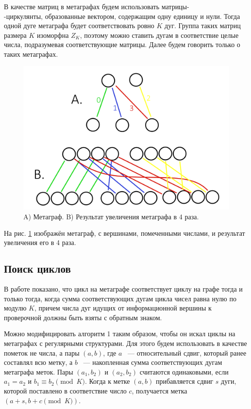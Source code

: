 \documentclass[14pt]{mmcs-article}
\begin{document}
В качестве матриц в метаграфах будем использовать матрицы-\\-циркулянты, образованные вектором, содержащим одну единицу и нули. Тогда одной дуге метаграфа будет соответствовать ровно $K$ дуг. Группа таких матриц размера $K$ изоморфна $Z_K$, поэтому можно ставить дугам в соответствие целые числа, подразумевая соответствующие матрицы. Далее будем говорить только о таких метаграфах.

\begin{figure}[H]
  \centering
  \includegraphics[scale=0.35]{Fig_8.png}
  \caption{ A) Метаграф. B) Результат увеличения метаграфа в 4 раза. }
  \label{metagraph:1}
\end{figure}

На рис. \ref{metagraph:1} изображён метаграф, с вершинами, помеченными числами, и результат увеличения его в 4 раза.

\subsection{Поиск циклов}

В работе \cite{metagraphs} показано, что цикл на метаграфе соответствует циклу на графе тогда и только тогда, когда сумма соответствующих дугам цикла чисел равна нулю по модулю $K$, причем числа дуг идущих от информационной вершины к проверочной должны быть взяты с обратным знаком.

Можно модифицировать алгоритм 1 таким образом, чтобы он искал циклы на метаграфах с регулярными структурами. Для этого будем использовать в качестве пометок не числа, а пары $(a, b)$, где $a$ ~--- относительный сдвиг, который ранее составлял всю метку, а $b$ ~--- накопленная сумма соответствующих дугам метаграфа меток. Пары $(a_1, b_2)$ и $(a_2, b_2)$ считаются одинаковыми, если $a_1 = a_2$ и $b_1 \equiv b_2 \pmod K$. Когда к метке $(a, b)$ прибавляется сдвиг $s$ дуги, которой поставлено в соответствие число $c$, получается метка $(a + s, b + c \pmod K)$.
\end{document}
